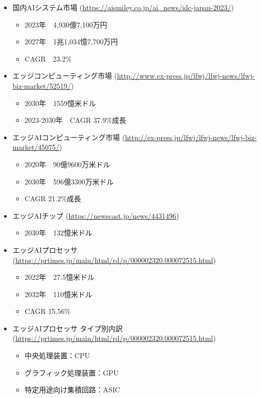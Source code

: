 \begin{itemize}
\begin{itemize}
\begin{itemize}
			\end{itemize}
			\item 国内AIシステム市場 (\url{https://aismiley.co.jp/ai_news/idc-japan-2023/})
			\begin{itemize}
				\item 2023年　4,930億7,100万円
				\item 2027年　1兆1,034憶7,700万円
				\item CAGR　23.2\%
			\end{itemize}
		\item エッジコンピューティング市場 (\url{http://www.ex-press.jp/lfwj/lfwj-news/lfwj-biz-market/52519/})
		\begin{itemize}
			\item 2030年　1559憶米ドル
			\item 2023-2030年　CAGR 37.9\%成長
		\end{itemize}
		\item エッジAIコンピューティング市場 (\url{http://ex-press.jp/lfwj/lfwj-news/lfwj-biz-market/45075/})
		\begin{itemize}
			\item 2020年　90億9600万米ドル
			\item 2030年　596億3300万米ドル
			\item CAGR 21.2\%成長
		\end{itemize}
		\item エッジAIチップ (\url{https://newscast.jp/news/4431496})
		\begin{itemize}
			\item 2030年　132憶米ドル
		\end{itemize}
		\item エッジAIプロセッサ (\url{https://prtimes.jp/main/html/rd/p/000002320.000072515.html})
		\begin{itemize}
			\item 2022年　27.5憶米ドル
			\item 2032年　110憶米ドル
			\item CAGR 15.56\%
		\end{itemize}
		\item エッジAIプロセッサ タイプ別内訳 (\url{https://prtimes.jp/main/html/rd/p/000002320.000072515.html})
		\begin{itemize}
			\item 中央処理装置：CPU
			\item グラフィック処理装置：GPU
			\item 特定用途向け集積回路：ASIC
			\begin{itemize}

\end{itemize}
\end{itemize}
\end{itemize}
\end{itemize}
